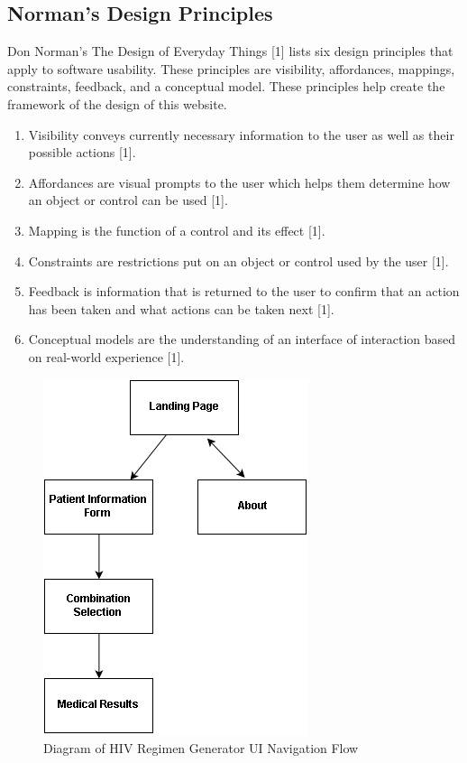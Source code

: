 \documentclass[12pt]{article}
\begin{document}
\subsection{Norman’s Design Principles}
Don Norman’s The Design of Everyday Things [1] lists six design principles that apply to software usability. These principles are visibility, affordances, mappings, constraints, feedback, and a conceptual model. These principles help create the framework of the design of this website.

\begin{enumerate}
\item Visibility conveys currently necessary information to the user as well as their possible actions [1].
\item Affordances are visual prompts to the user which helps them determine how an object or control can be used [1].
\item Mapping is the function of a control and its effect [1].
\item Constraints are restrictions put on an object or control used by the user [1].
\item Feedback is information that is returned to the user to confirm that an action has been taken and what actions can be taken next [1].
\item Conceptual models are the understanding of an interface of interaction based on real-world experience [1].
\end{enumerate}

\begin{figure}[!h]
  \centering
  \includegraphics{navflow.png}
  \caption{Diagram of HIV Regimen Generator UI Navigation Flow}
  \label{fig:Diagram of HIV Regimen Generator UI Navigation Flow}
\end{figure}
\end{document}
